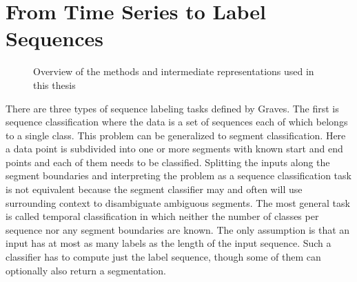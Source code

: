 \chapter{From Time Series to Label Sequences}
\label{cha:methods}

\begin{figure}[h]
  \caption{Overview of the methods and intermediate representations used in this
    thesis}
  \label{fig:method-overview}
\end{figure}

There are three types of sequence labeling tasks defined by Graves. The first is
sequence classification where the data is a set of sequences each of which
belongs to a single class. This problem can be generalized to segment
classification. Here a data point is subdivided into one or more segments with
known start and end points and each of them needs to be classified. Splitting
the inputs along the segment boundaries and interpreting the problem as a
sequence classification task is not equivalent because the segment classifier
may and often will use surrounding context to disambiguate ambiguous segments.
The most general task is called temporal classification in which neither the
number of classes per sequence nor any segment boundaries are known. The only
assumption is that an input has at most as many labels as the length of the
input sequence. Such a classifier has to compute just the label sequence, though
some of them can optionally also return a segmentation.

